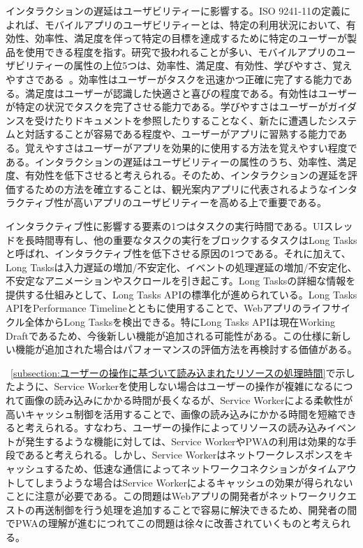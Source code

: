 インタラクションの遅延はユーザビリティーに影響する。ISO 9241-11の定義によれば、モバイルアプリのユーザビリティーとは、特定の利用状況において、有効性、効率性、満足度を伴って特定の目標を達成するために特定のユーザーが製品を使用できる程度を指す。研究で扱われることが多い、モバイルアプリのユーザビリティーの属性の上位5つは、効率性、満足度、有効性、学びやすさ、覚えやすさである~\cite{PawelUsabilityofMobileApplications}。効率性はユーザーがタスクを迅速かつ正確に完了する能力である。満足度はユーザーが認識した快適さと喜びの程度である。有効性はユーザーが特定の状況でタスクを完了させる能力である。学びやすさはユーザーがガイダンスを受けたりドキュメントを参照したりすることなく、新たに遭遇したシステムと対話することが容易である程度や、ユーザーがアプリに習熟する能力である。覚えやすさはユーザーがアプリを効果的に使用する方法を覚えやすい程度である。インタラクションの遅延はユーザビリティーの属性のうち、効率性、満足度、有効性を低下させると考えられる。そのため、インタラクションの遅延を評価するための方法を確立することは、観光案内アプリに代表されるようなインタラクティブ性が高いアプリのユーザビリティーを高める上で重要である。

インタラクティブ性に影響する要素の1つはタスクの実行時間である。UIスレッドを長時間専有し、他の重要なタスクの実行をブロックするタスクはLong Tasksと呼ばれ、インタラクティブ性を低下させる原因の1つである。それに加えて、Long Tasksは入力遅延の増加/不安定化、イベントの処理遅延の増加/不安定化、不安定なアニメーションやスクロールを引き起こす。Long Tasksの詳細な情報を提供する仕組みとして、Long Tasks APIの標準化が進められている。Long Tasks APIをPerformance Timelineとともに使用することで、Webアプリのライフサイクル全体からLong Tasksを検出できる。特にLong Tasks APIは現在Working Draftであるため、今後新しい機能が追加される可能性がある。この仕様に新しい機能が追加された場合はパフォーマンスの評価方法を再検討する価値がある。

~\autoref{subsection:ユーザーの操作に基づいて読み込まれたリソースの処理時間}で示したように、Service Workerを使用しない場合はユーザーの操作が複雑になるにつれて画像の読み込みにかかる時間が長くなるが、Service Workerによる柔軟性が高いキャッシュ制御を活用することで、画像の読み込みにかかる時間を短縮できると考えられる。すなわち、ユーザーの操作によってリソースの読み込みイベントが発生するような機能に対しては、Service WorkerやPWAの利用は効果的な手段であると考えられる。しかし、Service Workerはネットワークレスポンスをキャッシュするため、低速な通信によってネットワークコネクションがタイムアウトしてしまうような場合はService Workerによるキャッシュの効果が得られないことに注意が必要である。この問題はWebアプリの開発者がネットワークリクエストの再送制御を行う処理を追加することで容易に解決できるため、開発者の間でPWAの理解が進むにつれてこの問題は徐々に改善されていくものと考えられる。

